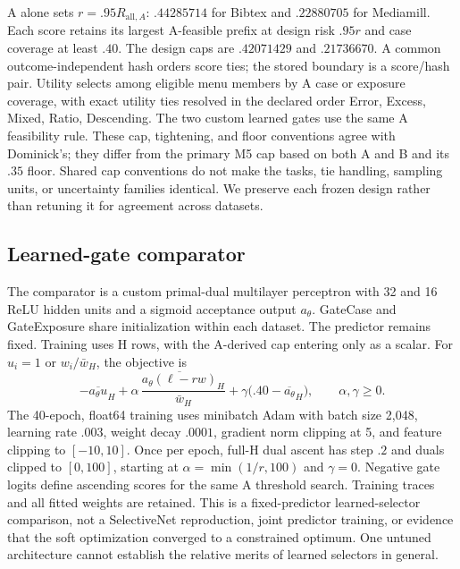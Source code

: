 A alone sets $r=.95R_{\mathrm{all},A}$: $.44285714$ for Bibtex and $.22880705$ for Mediamill. Each score retains its largest A-feasible prefix at design risk $.95r$ and case coverage at least $.40$. The design caps are $.42071429$ and $.21736670$. A common outcome-independent hash orders score ties; the stored boundary is a score/hash pair. Utility selects among eligible menu members by A case or exposure coverage, with exact utility ties resolved in the declared order Error, Excess, Mixed, Ratio, Descending. The two custom learned gates use the same A feasibility rule. These cap, tightening, and floor conventions agree with Dominick's; they differ from the primary M5 cap based on both A and B and its $.35$ floor. Shared cap conventions do not make the tasks, tie handling, sampling units, or uncertainty families identical. We preserve each frozen design rather than retuning it for agreement across datasets.

\subsection{Learned-gate comparator}
\label{sec:v13-gate-design}
The comparator is a custom primal-dual multilayer perceptron with 32 and 16 ReLU hidden units and a sigmoid acceptance output $a_\theta$. GateCase and GateExposure share initialization within each dataset. The predictor remains fixed. Training uses H rows, with the A-derived cap entering only as a scalar. For $u_i=1$ or $w_i/\bar w_H$, the objective is
\begin{equation}
 -\overline{a_\theta u}_{H}
 +\alpha\,\frac{\overline{a_\theta(\ell-rw)}_{H}}{\bar w_H}
 +\gamma\bigl(.40-\overline{a_\theta}_{H}\bigr),
 \qquad \alpha,\gamma\geq0.
 \label{eq:v13-gate-objective}
\end{equation}
The 40-epoch, float64 training uses minibatch Adam with batch size 2,048, learning rate $.003$, weight decay $.0001$, gradient norm clipping at 5, and feature clipping to $[-10,10]$. Once per epoch, full-H dual ascent has step $.2$ and duals clipped to $[0,100]$, starting at $\alpha=\min(1/r,100)$ and $\gamma=0$. Negative gate logits define ascending scores for the same A threshold search. Training traces and all fitted weights are retained. This is a fixed-predictor learned-selector comparison, not a SelectiveNet reproduction, joint predictor training, or evidence that the soft optimization converged to a constrained optimum. One untuned architecture cannot establish the relative merits of learned selectors in general.

